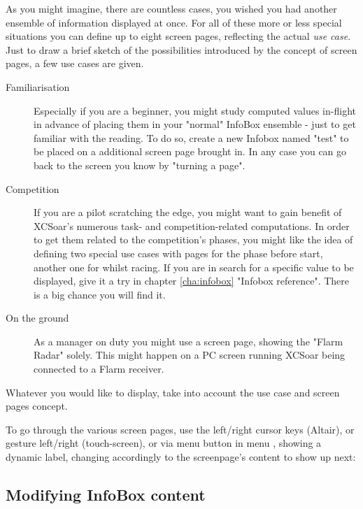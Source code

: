 As you might imagine, there are countless cases, you wished you had another
ensemble of information displayed at once.  For all of these more or less
special situations you can define up to eight screen pages, reflecting the
actual \emph{use case}. Just to draw a brief sketch of the possibilities
introduced by the concept of screen pages, a few use cases are given.
\label{par:use_case}
\begin{description}
\item[Familiarisation] Especially if you are a beginner, you might study
computed values in-flight in advance of placing them in your "normal" InfoBox
ensemble - just to get familiar with the reading. To do so, create a new
Infobox named "test" to be placed on a additional screen page brought in. In
any case you can go back to the screen you know by "turning a page".
\item[Competition] If you are a pilot scratching the edge, you might want to
gain benefit of XCSoar's numerous task- and competition-related computations.
In order to get them related to the competition's phases, you might like the
idea of defining two special use cases with pages for the phase before start,
another one for whilst racing.  If you are in search for a specific value to
be displayed, give it a try in chapter \ref{cha:infobox} "Infobox reference".
There is a big chance you will find it.
\item[On the ground] As a manager on duty you might use a screen page, showing
the "Flarm Radar" solely.  This might happen on a PC screen running XCSoar
being connected to a Flarm receiver.
\end{description}

Whatever you would like to display, take into account the use case and screen
pages concept.

To go through the various screen pages, use the left/right cursor
keys (Altair), or gesture left/right (touch-screen), or via menu button in menu , showing a dynamic label, changing accordingly to the screenpage's content to show up next:

\blink{}\blink{}\blink{}\blink{}


\subsection*{Modifying InfoBox content}

